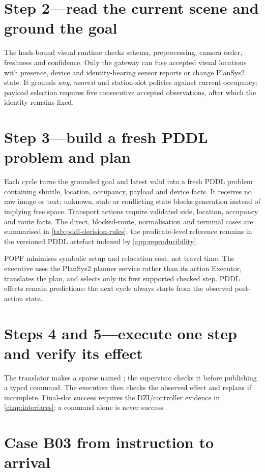 \section{Step 2---read the current scene and ground the goal}

The hash-bound visual runtime checks schema, preprocessing, camera order,
freshness and confidence. Only the gateway can fuse accepted visual locations
with presence, device and identity-bearing sensor reports or change PlanSys2
state. It grounds \emph{any}, \emph{nearest} and station-slot policies against
current occupancy; payload selection requires five consecutive accepted
observations, after which the identity remains fixed.

\section{Step 3---build a fresh PDDL problem and plan}

Each cycle turns the grounded goal and latest valid  into a
fresh PDDL problem containing shuttle, location, occupancy, payload and device
facts. It receives no raw image or text; unknown, stale or conflicting state
blocks generation instead of implying free space. Transport actions require
validated side, location, occupancy and route facts. The direct, blocked-route,
normalisation and terminal cases are summarised in
\cref{tab:pddl-decision-rules}; the predicate-level reference remains in the
versioned PDDL artefact indexed by \cref{app:reproducibility}.

POPF minimises symbolic setup and relocation cost, not travel time. The executive
uses the PlanSys2 planner service rather than its action Executor, translates the
plan, and selects only its first supported checked step. PDDL effects remain
predictions: the next cycle always starts from the observed post-action state.

\section{Steps 4 and 5---execute one step and verify its effect}

The translator makes a sparse named ; the supervisor
checks it before publishing a typed command. The executive then checks the
observed effect and replans if incomplete. Final-slot success requires the
DZI/controller evidence in \cref{chap:interfaces}; a command alone is never
success.

\section{Case B03 from instruction to arrival}

